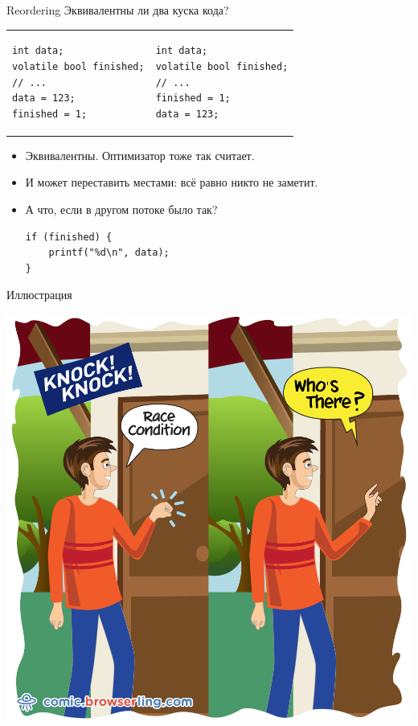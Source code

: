 \begin{frame}[fragile]{Reordering}
	Эквивалентны ли два куска кода?
	\begin{tabular}{p{}p{}}
		\centering
\begin{verbatim}
int data;
volatile bool finished;
// ...
data = 123;
finished = 1;
\end{verbatim}
&
\begin{verbatim}
int data;
volatile bool finished;
// ...
finished = 1;
data = 123;
\end{verbatim}
	\end{tabular}
	\pause
	\begin{itemize}
		\item Эквивалентны. Оптимизатор тоже так считает.
		\pause\item И может переставить местами: всё равно никто не заметит.
		\pause\item А что, если в другом потоке было так?
\begin{verbatim}
if (finished) {
    printf("%d\n", data);
}
\end{verbatim}
	\end{itemize}
\end{frame}

\begin{frame}{Иллюстрация}
	\begin{center}
		\includegraphics[scale=0.2]{race-condition-knock-knock.jpg}
	\end{center}
\end{frame}


